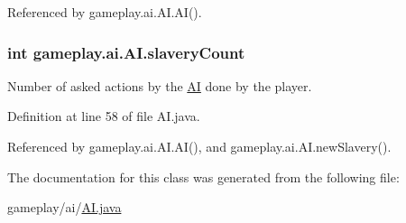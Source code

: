 Referenced by gameplay.\-ai.\-A\-I.\-A\-I().

\hypertarget{classgameplay_1_1ai_1_1_a_i_a891607c5493095d3c5e7988b401b769c}{
\subsubsection[{slavery\-Count}]{\setlength{\rightskip}{0pt plus 5cm}int gameplay.\-ai.\-A\-I.\-slavery\-Count\hspace{0.3cm}{\ttfamily [protected]}}}\label{classgameplay_1_1ai_1_1_a_i_a891607c5493095d3c5e7988b401b769c}


Number of asked actions by the \hyperlink{classgameplay_1_1ai_1_1_a_i}{A\-I} done by the player. 



Definition at line 58 of file A\-I.\-java.



Referenced by gameplay.\-ai.\-A\-I.\-A\-I(), and gameplay.\-ai.\-A\-I.\-new\-Slavery().



The documentation for this class was generated from the following file\-:\begin{DoxyCompactItemize}
\item 
gameplay/ai/\hyperlink{_a_i_8java}{A\-I.\-java}\end{DoxyCompactItemize}
